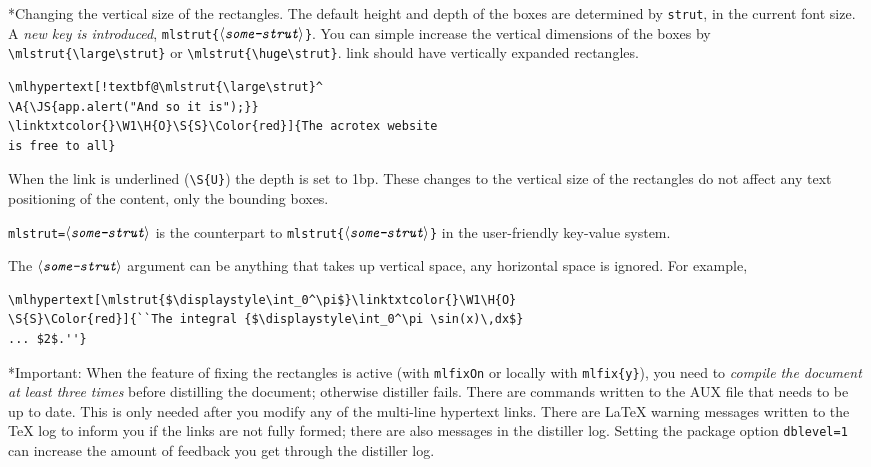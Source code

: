 \documentclass{article}
\makeatletter
\edef\amtIndent{\the\leftmargini}
\def\anglemeta#1{$\langle\textit{\texttt{#1}}\rangle$}
\let\ameta\anglemeta
\def\darg#1{\texttt{\{#1\}}}
\def\cs#1{\texttt{\@backslashchar#1}}
\renewcommand{\paragraph}
    {\@startsection{paragraph}{4}{0pt}{6pt}{-3pt}{\bfseries}}
\makeatother
\begin{document}
\paragraph*{Changing the vertical size of the rectangles.} The default height
and depth of the boxes are determined by \cs{strut}, in the current font
size. A \emph{new key is introduced}, \cs{mlstrut\darg{\ameta{some-strut}}}.
You can simple increase the vertical dimensions of the boxes by
\verb~\mlstrut{\large\strut}~ or \verb~\mlstrut{\huge\strut}~.
 link should have vertically expanded rectangles.
\begin{Verbatim}[xleftmargin=\amtIndent,fontsize=\small,commandchars={!@^}]
\mlhypertext[!textbf@\mlstrut{\large\strut}^
\A{\JS{app.alert("And so it is");}}
\linktxtcolor{}\W1\H{O}\S{S}\Color{red}]{The acrotex website
is free to all}
\end{Verbatim}
When the link is underlined (\verb~\S{U}~) the depth is set to 1bp. These
changes to the vertical size of the rectangles do not affect any text
positioning of the content, only the bounding boxes.

\texttt{mlstrut=\ameta{some-strut}} is the counterpart to
 \cs{mlstrut\darg{\ameta{some-strut}}} in the user-friendly key-value system.

The \ameta{some-strut} argument can be anything that takes up vertical space, any horizontal space is ignored.
For example, 
\begin{Verbatim}[xleftmargin=\amtIndent,fontsize=\small,commandchars=!()]
\mlhypertext[\mlstrut{$\displaystyle\int_0^\pi$}\linktxtcolor{}\W1\H{O}
\S{S}\Color{red}]{``The integral {$\displaystyle\int_0^\pi \sin(x)\,dx$}
... $2$.''}
\end{Verbatim}

\paragraph*{Important:} When the feature of fixing the
rectangles is active (with \cs{mlfixOn} or locally with \cs{mlfix\darg{y}}),
you need to \emph{compile the document at least three times} before
distilling the document; otherwise distiller fails. There are commands
written to the \textsf{AUX} file that needs to be up to date. This is only
needed after you modify any of the multi-line hypertext links. There are
{\LaTeX} warning messages written to the {\TeX} log to inform you if the
links are not fully formed; there are also messages in the distiller log.
Setting the package option \texttt{dblevel=1} can increase the amount of
feedback you get through the distiller log.
\end{document}
